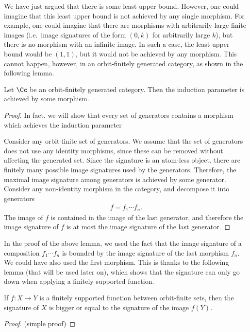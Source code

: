 We have just argued that there is some least upper bound. However, one could imagine that this least upper bound is not achieved by any single morphism. For example, one could imagine that there are morphisms with arbitrarily large finite images (i.e.~image signatures of the form $(0,k)$ for arbitrarily large $k$),  but there is no morphism with an infinite image. In such a case, the least upper bound would be $(1,1)$, but it would not be achieved by any morphism. This cannot happen, however, in an orbit-finitely generated category, as shown in the following lemma. 

\begin{lemma}\label{lem:maximal-image-signature}
    Let $\Cc$ be an orbit-finitely generated category. Then the induction parameter is achieved by some morphism.
\end{lemma}
\begin{proof} In fact, we will show that every set of generators contains a morphism which achieves the induction parameter
    
    
Consider any orbit-finite set of generators. We assume that the set of generators does not use any identity morphisms, since these can be removed without affecting the generated set.  
Since the signature is an atom-less object, there are finitely many possible image signatures used by the generators. Therefore, the maximal image  signature among generators is achieved by some generator.     Consider  any non-identity morphism in the category, and decompose it into generators  
    \begin{align*}
     f = f_1  \cdots f_n. 
    \end{align*}
The image of $f$ is contained in the image of the last generator, and therefore the image signature of $f$ is at most the image signature of the last generator. 
\end{proof}


In the proof of the above lemma, we used the fact that the image signature of a composition $f_1 \cdots f_n$ is bounded by the image signature of the last morphism $f_n$. We could have also used the first morphism. This is thanks to the following lemma (that will be used later on), which shows that the signature can only go down when applying  a finitely supported function. 
\begin{lemma}\label{lem:signature-decrease-across-functions}
    If $f : X \to Y$ is a finitely supported function between orbit-finite sets, then the signature of $X$ is  bigger or equal to the signature of the image $f(Y)$.
\end{lemma}
\begin{proof}
    (simple proof)
\end{proof}




